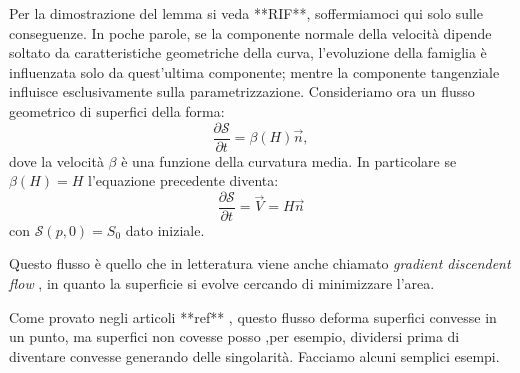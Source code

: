 Per la dimostrazione del lemma si veda **RIF**, soffermiamoci qui solo sulle conseguenze.
In poche parole, se la componente normale della velocità dipende soltato da caratteristiche geometriche della curva, l'evoluzione della famiglia è influenzata solo da quest'ultima componente; mentre la componente tangenziale influisce esclusivamente sulla parametrizzazione.
Consideriamo ora un flusso geometrico di superfici della forma:
\[
\frac{\partial\mathcal{S}}{\partial t} = \beta(H)\vec{n},
\] 
dove la velocità $\beta$ è una funzione della curvatura media. In particolare se $\beta(H)=H$ l'equazione precedente diventa:
\begin{equation}
  \label{eq:cp-123}
  \frac{\partial\mathcal{S}}{\partial t} = \vec{V} = H\vec{n}
\end{equation}
con $\mathcal{S}(p,0)=S_0$ dato iniziale.
\begin{osservazione}
Questo flusso è quello che in letteratura viene anche chiamato \emph{gradient discendent flow} , in quanto la superficie si evolve cercando di minimizzare l'area. 
\end{osservazione}
\begin{osservazione}
Come provato negli articoli **ref** , questo flusso deforma superfici convesse in un punto, ma superfici non covesse posso ,per esempio, dividersi prima di diventare convesse generando delle singolarità. Facciamo alcuni semplici esempi.
\end{osservazione}

